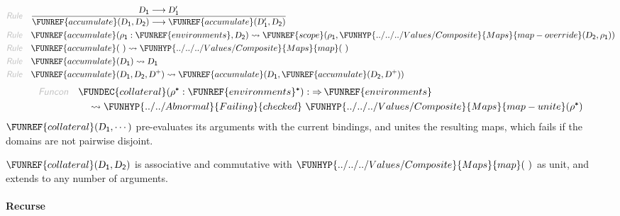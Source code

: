 \begin{align*}
  \KEY{Rule} \quad
    & \frac{
       \VAR{D}\SUB{1} \TRANS 
        \VAR{D}\SUB{1}'
      }{
       \FUNREF{accumulate}
                    (  \VAR{D}\SUB{1}, 
                           \VAR{D}\SUB{2} ) \TRANS 
        \FUNREF{accumulate}
          (  \VAR{D}\SUB{1}', 
                 \VAR{D}\SUB{2} )
      }
\\
  \KEY{Rule} \quad
    & \FUNREF{accumulate}
        (  \VAR{\ensuremath{\rho}}\SUB{1} : \FUNREF{environments}, 
               \VAR{D}\SUB{2} ) \leadsto 
        \FUNREF{scope}
          (  \VAR{\ensuremath{\rho}}\SUB{1}, 
                 \FUNHYP{../../../Values/Composite}{Maps}{map-override}
                  (  \VAR{D}\SUB{2}, 
                         \VAR{\ensuremath{\rho}}\SUB{1} ) )
\\
  \KEY{Rule} \quad
    & \FUNREF{accumulate}
        (   \  ) \leadsto 
        \FUNHYP{../../../Values/Composite}{Maps}{map}
          (   \  )
\\
  \KEY{Rule} \quad
    & \FUNREF{accumulate}
        (  \VAR{D}\SUB{1} ) \leadsto 
        \VAR{D}\SUB{1}
\\
  \KEY{Rule} \quad
    & \FUNREF{accumulate}
        (  \VAR{D}\SUB{1}, 
               \VAR{D}\SUB{2}, 
               \VAR{D}\PLUS ) \leadsto 
        \FUNREF{accumulate}
          (  \VAR{D}\SUB{1}, 
                 \FUNREF{accumulate}
                  (  \VAR{D}\SUB{2}, 
                         \VAR{D}\PLUS ) )
\end{align*}
\begin{align*}
  \KEY{Funcon} \quad
  & \FUNDEC{collateral}(
                       \VAR{\ensuremath{\rho}}\STAR : \FUNREF{environments}\STAR) 
    :  \TO \FUNREF{environments} \\&\quad
    \leadsto \FUNHYP{../../Abnormal}{Failing}{checked} \ 
               \FUNHYP{../../../Values/Composite}{Maps}{map-unite}
                 (  \VAR{\ensuremath{\rho}}\STAR )
\end{align*}
$\FUNREF{collateral}
    (  \VAR{D}\SUB{1}, 
           \cdots )$ pre-evaluates its arguments with the current bindings,
  and unites the resulting maps, which fails if the domains are not pairwise
  disjoint.

$\FUNREF{collateral}
    (  \VAR{D}\SUB{1}, 
           \VAR{D}\SUB{2} )$ is associative and commutative with $\FUNHYP{../../../Values/Composite}{Maps}{map}
    (   \  )$ as unit, 
  and extends to any number of arguments.

\paragraph{Recurse}\hypertarget{recurse}{}\label{recurse}

